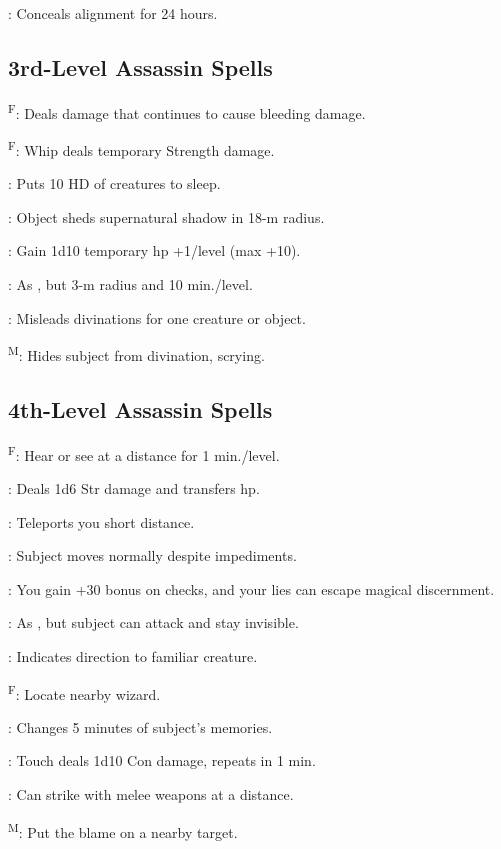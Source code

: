 : Conceals alignment for 24 hours.




\subsection{3rd-Level Assassin Spells}

\textsuperscript{F}: Deals damage that continues to cause bleeding damage.%

\textsuperscript{F}: Whip deals temporary Strength damage. %

: Puts 10 HD of creatures to sleep.

: Object sheds supernatural shadow in 18-m radius.

: Gain 1d10 temporary hp +1/level (max +10).

: As , but 3-m radius and 10 min./level.

: Misleads divinations for one creature or object.

\textsuperscript{M}: Hides subject from divination, scrying.




\subsection{4th-Level Assassin Spells}

\textsuperscript{F}: Hear or see at a distance for 1 min./level.

: Deals 1d6 Str damage and transfers hp. %

: Teleports you short distance.

: Subject moves normally despite impediments.

: You gain +30 bonus on  checks, and your lies can escape magical discernment.

: As , but subject can attack and stay invisible.

: Indicates direction to familiar creature.

\textsuperscript{F}: Locate nearby wizard. %

: Changes 5 minutes of subject’s memories.

: Touch deals 1d10 Con damage, repeats in 1 min.

: Can strike with melee weapons at a distance. %

\textsuperscript{M}: Put the blame on a nearby target. %
